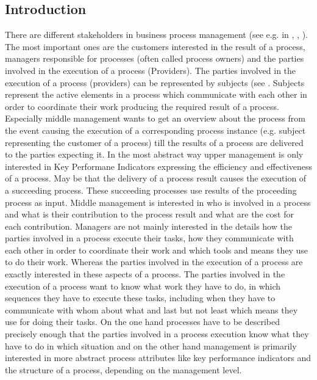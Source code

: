 \subsection{Introduction}
There are different stakeholders in business process management (see e.g. in \cite{art:Stakeholder}, \cite{book:Worklow-Mod}, \cite{book:BPM-Handbook2}). The most important ones are the customers interested in the result of a process, managers responsible for processes (often called process owners) and the parties involved in the execution of a process (Providers). The parties involved in the execution of a process (providers) can be represented by subjects (see \cite{book:flei2011}. Subjects represent the active elements in a process which communicate with each other in order to coordinate their work producing the required result of a process. Especially middle management wants to get an overview about the process from the event causing the execution of a corresponding process instance (e.g. subject representing the customer of a process) till the results of a process are delivered to the parties expecting it. In the most abstract way upper management is only interested in Key Performane Indicators expressing the efficiency and effectiveness of a process. May be that the delivery of a process result causes the execution of a succeeding process. These succeeding processes use results of the proceeding process as input.
Middle management is interested in who is involved in a process and what  is their contribution to the process result and what are the cost for each contribution. Managers are not mainly interested in the details how the parties involved in a process execute their tasks, how they communicate with each other in order to coordinate their work and which tools and means they use to do their work. Whereas the parties involved in the execution of a process are exactly interested in these aspects of a process. The parties involved in the execution of a process want to know what work they have to do, in which sequences they have to execute these tasks, including when they have to communicate with whom about what and last but not least which means they use for doing their tasks.
On the one hand processes have to be described precisely enough that the parties involved in a process execution know what they have to do in which situation and on the other hand management is primarily interested in more abstract process attributes like key performance indicators and the structure of a process, depending on the management level.\\


